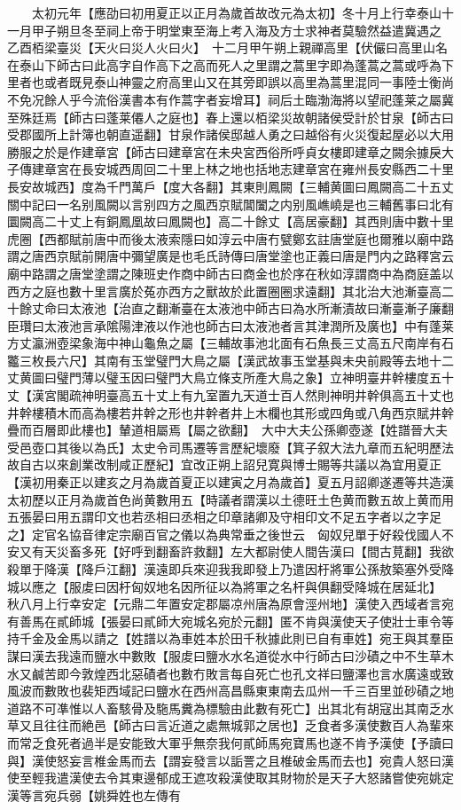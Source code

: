 　　太初元年【應劭曰初用夏正以正月為歲首故改元為太初】冬十月上行幸泰山十一月甲子朔旦冬至祠上帝于明堂東至海上考入海及方士求神者莫驗然益遣冀遇之　乙酉栢梁臺災【天火曰災人火曰火】　十二月甲午朔上親禪高里【伏儼曰高里山名在泰山下師古曰此高字自作高下之高而死人之里謂之蒿里字即為蓬蒿之蒿或呼為下里者也或者既見泰山神靈之府高里山又在其旁即誤以高里為蒿里混同一事陸士衡尚不免况餘人乎今流俗漢書本有作蒿字者妄增耳】祠后土臨渤海將以望祀蓬莱之屬冀至殊廷焉【師古曰蓬莱僊人之庭也】春上還以栢梁災故朝諸侯受計於甘泉【師古曰受郡國所上計簿也朝直遥翻】甘泉作諸侯邸越人勇之曰越俗有火災復起屋必以大用勝服之於是作建章宮【師古曰建章宮在未央宮西俗所呼貞女樓即建章之闕余據戾大子傳建章宮在長安城西周回二十里上林之地也括地志建章宮在雍州長安縣西二十里長安故城西】度為千門萬戶【度大各翻】其東則鳳闕【三輔黄圖曰鳳闕高二十五丈關中記曰一名别風闕以言别四方之風西京賦閶闔之内别風嶕嶢是也三輔舊事曰北有圜闕高二十丈上有銅鳳凰故曰鳳闕也】高二十餘丈【高居豪翻】其西則唐中數十里虎圈【西都賦前唐中而後太液索隱曰如淳云中唐冇甓鄭玄註唐堂庭也爾雅以廟中路謂之唐西京賦前開唐中彌望廣是也毛氏詩傳曰唐堂塗也正義曰唐是門内之路釋宮云廟中路謂之唐堂塗謂之陳班史作商中師古曰商金也於序在秋如淳謂商中為商庭盖以西方之庭也數十里言廣於菟亦西方之獸故於此置圈圈求遠翻】其北治大池漸臺高二十餘丈命曰太液池【治直之翻漸臺在太液池中師古曰為水所漸漬故曰漸臺漸子廉翻臣瓚曰太液池言承隂陽津液以作池也師古曰太液池者言其津潤所及廣也】中有蓬莱方丈瀛洲壺梁象海中神山龜魚之屬【三輔故事池北面有石魚長三丈高五尺南岸有石龞三枚長六尺】其南有玉堂璧門大鳥之屬【漢武故事玉堂基與未央前殿等去地十二丈黄圖曰璧門薄以璧玉因曰璧門大鳥立條支所產大鳥之象】立神明臺井幹樓度五十丈【漢宮閣疏神明臺高五十丈上有九室置九天道士百人然則神明井幹俱高五十丈也井幹樓積木而高為樓若井幹之形也井幹者井上木欄也其形或四角或八角西京賦井幹疊而百層即此樓也】輦道相屬焉【屬之欲翻】　大中大夫公孫卿壺遂【姓譜晉大夫受邑壺口其後以為氏】太史令司馬遷等言歷紀壞廢【箕子叙大法九章而五紀明歷法故自古以來創業改制咸正歷紀】宜改正朔上詔兒寛與博士賜等共議以為宜用夏正【漢初用秦正以建亥之月為歲首夏正以建寅之月為歲首】夏五月詔卿遂遷等共造漢太初歷以正月為歲首色尚黄數用五【時議者謂漢以土德旺土色黄而數五故上黄而用五張晏曰用五謂印文也若丞相曰丞相之印章諸卿及守相印文不足五字者以之字足之】定官名協音律定宗廟百官之儀以為典常垂之後世云　匈奴兒單于好殺伐國人不安又有天災畜多死【好呼到翻畜許救翻】左大都尉使人間告漢曰【間古莧翻】我欲殺單于降漢【降戶江翻】漢遠即兵來迎我我即發上乃遣因杅將軍公孫敖築塞外受降城以應之【服䖍曰因杅匈奴地名因所征以為將軍之名杆與俱翻受降城在居延北】　秋八月上行幸安定【元鼎二年置安定郡屬凉州唐為原會涇州地】漢使入西域者言宛有善馬在貳師城【張晏曰貳師大宛城名宛於元翻】匿不肯與漢使天子使壯士車令等持千金及金馬以請之【姓譜以為車姓本於田千秋據此則已自有車姓】宛王與其羣臣謀曰漢去我遠而鹽水中數敗【服䖍曰鹽水水名道從水中行師古曰沙磧之中不生草木水又鹹苦即今敦煌西北惡磧者也數冇敗言每自死亡也孔文祥曰鹽澤也言水廣遠或致風波而數敗也裴矩西域記曰鹽水在西州高昌縣東東南去瓜州一千三百里並砂磧之地道路不可凖惟以人畜駭骨及駞馬糞為標驗由此數有死亡】出其北有胡寇出其南乏水草又且往往而絶邑【師古曰言近道之處無城郭之居也】乏食者多漢使數百人為輩來而常乏食死者過半是安能致大軍乎無奈我何貳師馬宛寶馬也遂不肯予漢使【予讀曰與】漢使怒妄言椎金馬而去【謂妄發言以詬詈之且椎破金馬而去也】宛貴人怒曰漢使至輕我遣漢使去令其東邊郁成王遮攻殺漢使取其財物於是天子大怒諸嘗使宛姚定漢等言宛兵弱【姚舜姓也左傳有